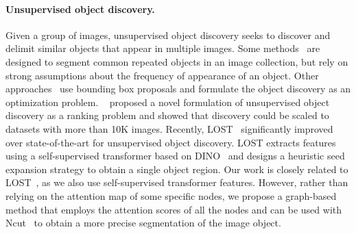 \documentclass[twocolumn]{article}
\begin{document}
\paragraph{Unsupervised object discovery.} Given a group of images, unsupervised object discovery seeks to discover and delimit similar objects that appear in multiple images. Some methods~\cite{joulin2010discriminative,joulin2012multi,vicente2011object,hsu2018co,chen2020show} are designed to segment common repeated objects in an image collection, but rely on strong assumptions about the frequency of appearance of an object. Other approaches~\cite{tang2014co,cho2015unsupervised,vo2019unsupervised,vo2020toward} use bounding box proposals and formulate the object discovery as an optimization problem.
~\cite{vo2021large} proposed a novel formulation of unsupervised object discovery as a ranking problem and showed that discovery could be scaled to datasets with more than 10K images. 
Recently, LOST~\cite{simeoni2021localizing} significantly improved over state-of-the-art for unsupervised object discovery. LOST extracts features using a self-supervised transformer based on DINO~\cite{caron2021emerging} and designs a heuristic seed expansion strategy to obtain a single object region. Our work is closely related to LOST~\cite{simeoni2021localizing},
as we also use self-supervised transformer features. However, rather than  relying on the attention map of some specific nodes, we propose a graph-based method that employs the attention scores of all the nodes and can be used with  Ncut~\cite{shi2000normalized} to obtain a more precise segmentation of the image object.
\end{document}
